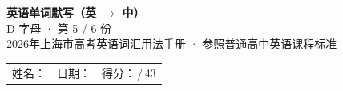 \documentclass[10pt,a4paper]{article}
\begin{document}
\pagestyle{plain}

\begin{center}
{\LARGE\bfseries 英语单词默写（英 $\to$ 中）}\\[0.22em]
{\large D 字母 · 第 5 / 6 份}\\[0.18em]
{\small 2026年上海市高考英语词汇用法手册 · 参照普通高中英语课程标准}
\end{center}

\vspace{0.25em}
\noindent\begin{tabular}{@{}p{}@{}p{}@{}p{}@{}}
姓名：\underline{\hspace{2.0cm}} & 日期：\underline{\hspace{2.0cm}} & 得分：\underline{\hspace{1.3cm}}\,/\,43 \\
\end{tabular}

\vspace{0.3em}

\vspace{0.08em}
\end{document}
